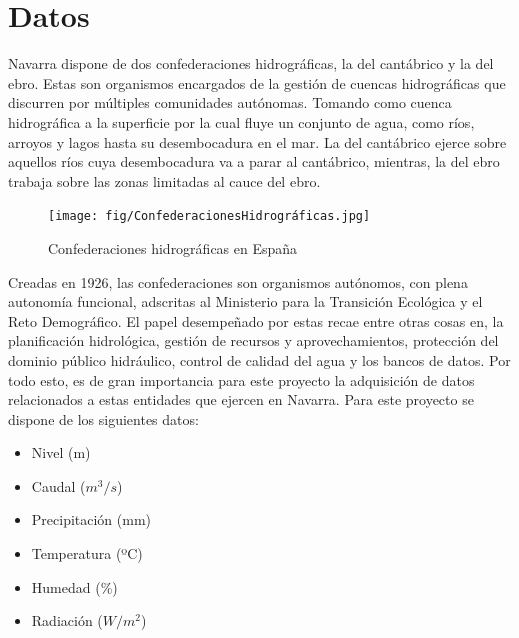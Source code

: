 \chapter[Datos]{Datos}
\label{Chap2}

Navarra dispone de dos confederaciones hidrográficas, la del cantábrico y la del ebro. Estas son organismos encargados de la gestión de cuencas hidrográficas que discurren por múltiples comunidades autónomas. Tomando como cuenca hidrográfica a la superficie por la cual fluye un conjunto de agua, como ríos, arroyos y lagos hasta su desembocadura en el mar.\newline
\newline
La del cantábrico ejerce sobre aquellos ríos cuya desembocadura va a parar al cantábrico, mientras, la del ebro trabaja sobre las zonas limitadas al cauce del ebro.

\begin{figure} [H]
	\centering
	\texttt{[image: fig/ConfederacionesHidrográficas.jpg]}
	\caption[Confederaciones hidrográficas en España]{Confederaciones hidrográficas en España}
	\label{fig:ej32}
\end{figure}

Creadas en 1926, las confederaciones son organismos autónomos, con plena autonomía funcional, adscritas al Ministerio para la Transición Ecológica y el Reto Demográfico. El papel desempeñado por estas recae entre otras cosas en, la planificación hidrológica, gestión de recursos y aprovechamientos, protección del dominio público hidráulico, control de calidad del agua y los bancos de datos.\newline
\newline
Por todo esto, es de gran importancia para este proyecto la adquisición de datos relacionados a estas entidades que ejercen en Navarra.\newline
\newline
Para este proyecto se dispone de los siguientes datos:

\begin{itemize}
	\setlength\itemsep{0.5em}
	\item Nivel (m)
	\item Caudal ($m^3/s$)
	\item Precipitación (mm)
	\item Temperatura (ºC)
	\item Humedad (\%)
	\item Radiación ($W/m^2$)
\end{itemize}

